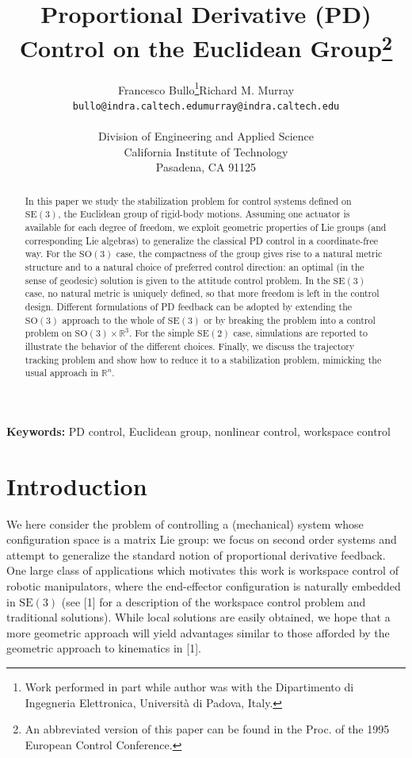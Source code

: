 \documentclass[10pt,twocolumn]{article}
\title{Proportional Derivative (PD) Control on the Euclidean Group\thanks{An abbreviated version of this paper can be found in the Proc. of the 1995 European Control Conference.}}
\author{\begin{tabular}{cc}
Francesco Bullo\thanks{Work performed in part while author was with the Dipartimento di Ingegneria Elettronica, Universit\`a di Padova, Italy.} & Richard M. Murray\\
\texttt{bullo@indra.caltech.edu} & \texttt{murray@indra.caltech.edu}
\end{tabular}\\[1em]
Division of Engineering and Applied Science\\
California Institute of Technology\\
Pasadena, CA 91125}
\date{}
\newcommand{\SO}{\mathrm{SO}}
\newcommand{\SE}{\mathrm{SE}}
\newcommand{\R}{\mathbb R}
\begin{document}
\maketitle


\noindent\textbf{Keywords:} PD control, Euclidean group, nonlinear control, workspace control

\begin{abstract}
In this paper we study the stabilization problem for control systems defined on $\SE(3)$, the Euclidean group of rigid-body motions. Assuming one actuator is available for each degree of freedom, we exploit geometric properties of Lie groups (and corresponding Lie algebras) to generalize the classical PD control in a coordinate-free way. For the $\SO(3)$ case, the compactness of the group gives rise to a natural metric structure and to a natural choice of preferred control direction: an optimal (in the sense of geodesic) solution is given to the attitude control problem. In the $\SE(3)$ case, no natural metric is uniquely defined, so that more freedom is left in the control design. Different formulations of PD feedback can be adopted by extending the $\SO(3)$ approach to the whole of $\SE(3)$ or by breaking the problem into a control problem on $\SO(3)\times\R^3$. For the simple $\SE(2)$ case, simulations are reported to illustrate the behavior of the different choices. Finally, we discuss the trajectory tracking problem and show how to reduce it to a stabilization problem, mimicking the usual approach in $\R^n$.
\end{abstract}

\section{Introduction}
We here consider the problem of controlling a (mechanical) system whose configuration space is a matrix Lie group: we focus on second order systems and attempt to generalize the standard notion of proportional derivative feedback. One large class of applications which motivates this work is workspace control of robotic manipulators, where the end-effector configuration is naturally embedded in $\SE(3)$ (see [1] for a description of the workspace control problem and traditional solutions). While local solutions are easily obtained, we hope that a more geometric approach will yield advantages similar to those afforded by the geometric approach to kinematics in [1].
\end{document}
